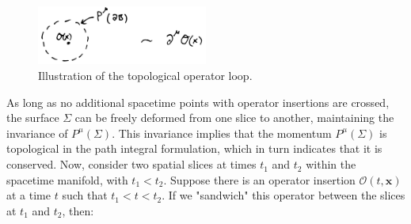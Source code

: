 \documentclass[12pt]{article}
\numberwithin{equation}{section}
\newcommand\<\langle
\renewcommand\>\rangle
\renewcommand\.{\cdot}
\begin{document}
\begin{figure}[h]
\centering
\includegraphics[width=0.5\textwidth]{surroundoperator.jpg} %
\caption{\label{surroundoperator}Illustration of the topological operator loop.}
\end{figure}

\indent As long as no additional spacetime points with operator insertions are crossed, the surface \( \Sigma \) can be freely deformed from one slice to another, maintaining the invariance of \( P^{\mu}(\Sigma) \). This invariance implies that the momentum \( P^{\mu}(\Sigma) \) is topological in the path integral formulation, which in turn indicates that it is conserved.
Now, consider two spatial slices at times \( t_1 \) and \( t_2 \) within the spacetime manifold, with \( t_1 < t_2 \). Suppose there is an operator insertion \( \mathcal{O}(t, \mathbf{x}) \) at a time \( t \) such that \( t_1 < t < t_2 \). If we "sandwich" this operator between the slices at \( t_1 \) and \( t_2 \), then:
\end{document}
